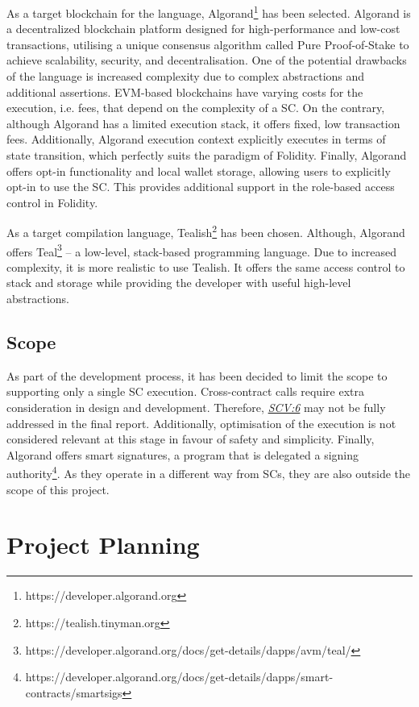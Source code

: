 \documentclass[oneside]{ecsproject}     %
\newcommand{\vref}[1]{\textit{\hyperref[#1]{#1}}}
\begin{document}
As a target blockchain for the language, Algorand\footnote{https://developer.algorand.org} has been selected. 
Algorand is a decentralized blockchain platform designed for high-performance and low-cost transactions, 
utilising a unique consensus algorithm called Pure Proof-of-Stake to achieve scalability, security, and decentralisation\cite{algorand}.
One of the potential drawbacks of the language is increased complexity due to complex abstractions and additional assertions. 
EVM-based blockchains have varying costs for the execution, i.e. fees, that depend on the complexity of a SC. 
On the contrary, although Algorand has a limited execution stack, it offers fixed, low transaction fees.
Additionally, Algorand execution context explicitly executes in terms of state transition, which perfectly suits the paradigm of Folidity.
Finally, Algorand offers opt-in functionality and local wallet storage, allowing users to explicitly opt-in to use the SC.
This provides additional support in the role-based access control in Folidity.

As a target compilation language, Tealish\footnote{https://tealish.tinyman.org} has been chosen.
Although, Algorand offers Teal\footnote{https://developer.algorand.org/docs/get-details/dapps/avm/teal/} –
a low-level, stack-based programming language. Due to increased complexity, it is more realistic to use Tealish.
It offers the same access control to stack and storage while providing the developer with useful high-level abstractions.


\section{Scope}

As part of the development process, it has been decided to limit the scope to supporting only a single SC execution.
Cross-contract calls require extra consideration in design and development. Therefore, \vref{SCV:6} may not be fully addressed in the final report.
Additionally, optimisation of the execution is not considered relevant at this stage in favour of safety and simplicity.
Finally, Algorand offers smart signatures, a program that is delegated a signing authority\footnote{https://developer.algorand.org/docs/get-details/dapps/smart-contracts/smartsigs}.
As they operate in a different way from SCs, they are also outside the scope of this project.

\begingroup
\renewcommand{\cleardoublepage}{}
\renewcommand{\clearpage}{}
\chapter{Project Planning}
\endgroup
\end{document}
